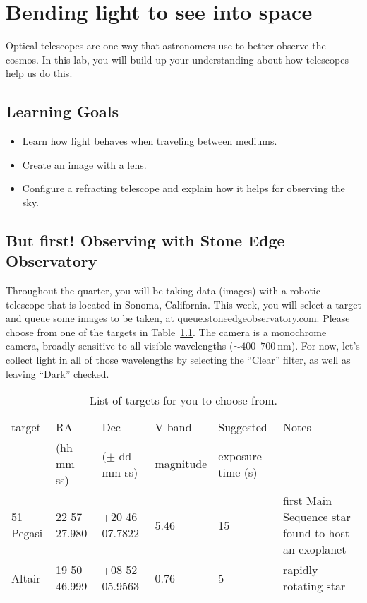 \chapter{Bending light to see into space}

Optical telescopes are one way that astronomers use to better observe the cosmos. In this lab, you will build up your understanding about how telescopes help us do this.

\section{Learning Goals}

\begin{itemize}
	\item Learn how light behaves when traveling between mediums.
	
	\item Create an image with a lens.
	
	\item Configure a refracting telescope and explain how it helps for observing the sky.
\end{itemize}

\section{But first! Observing with Stone Edge Observatory}

Throughout the quarter, you will be taking data (images) with a robotic telescope that is located in Sonoma, California. This week, you will select a target and queue some images to be taken, at \url{queue.stoneedgeobservatory.com}. Please choose from one of the targets in Table\ \ref{lt:tab:targets}. The camera is a monochrome camera, broadly sensitive to all visible wavelengths ($\sim 400$--$700\:$nm). For now, let's collect light in all of those wavelengths by selecting the ``Clear'' filter, as well as leaving ``Dark'' checked.

\begin{table}
	\begin{tabular}{p{0.6in}p{.8in}p{.9in}p{0.6in}p{0.9in}p{2in}}
		target & RA & Dec & V-band & Suggested & Notes \\
		& (hh mm ss) & ($\pm$ dd mm ss) & magnitude & exposure time (s) & \\ \hline
		51 Pegasi & 22 57 27.980 & +20 46 07.7822 & 5.46 & 15 & first Main Sequence star found to host an exoplanet \\
		Altair & 19 50 46.999 & +08 52 05.9563 & 0.76 & 5 & rapidly rotating star
	\end{tabular}
	\caption{List of targets for you to choose from.}\label{lt:tab:targets}
\end{table}

